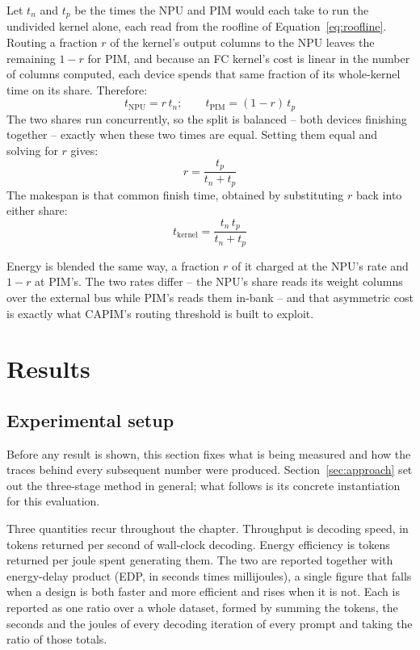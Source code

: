 \documentclass[11pt]{article}
\begin{document}
Let $t_n$ and $t_p$ be the times the NPU and PIM would each take to run the undivided kernel alone, each read from the roofline of Equation~\ref{eq:roofline}. Routing a fraction $r$ of the kernel's output columns to the NPU leaves the remaining $1-r$ for PIM, and because an FC kernel's cost is linear in the number of columns computed, each device spends that same fraction of its whole-kernel time on its share. Therefore:
\begin{equation}
t_{\text{NPU}} = r \, t_n ; \qquad t_{\text{PIM}} = (1 - r) \, t_p
\end{equation}
The two shares run concurrently, so the split is balanced -- both devices finishing together -- exactly when these two times are equal. Setting them equal and solving for $r$ gives:
\begin{equation}
r = \frac{t_p}{t_n + t_p}
\end{equation}
The makespan is that common finish time, obtained by substituting $r$ back into either share:
\begin{equation}
t_{\text{kernel}} = \frac{t_n \, t_p}{t_n + t_p}
\label{eq:balance}
\end{equation}

Energy is blended the same way, a fraction $r$ of it charged at the NPU's rate and $1-r$ at PIM's. The two rates differ -- the NPU's share reads its weight columns over the external bus while PIM's reads them in-bank -- and that asymmetric cost is exactly what CAPIM's routing threshold is built to exploit.


\newpage
\section{Results}

\subsection{Experimental setup}
\label{sec:expsetup}

Before any result is shown, this section fixes what is being measured and how the traces behind every subsequent number were produced. Section~\ref{sec:approach} set out the three-stage method in general; what follows is its concrete instantiation for this evaluation.

Three quantities recur throughout the chapter. Throughput is decoding speed, in tokens returned per second of wall-clock decoding. Energy efficiency is tokens returned per joule spent generating them. The two are reported together with energy-delay product (EDP, in seconds times millijoules), a single figure that falls when a design is both faster and more efficient and rises when it is not. Each is reported as one ratio over a whole dataset, formed by summing the tokens, the seconds and the joules of every decoding iteration of every prompt and taking the ratio of those totals.
\end{document}
